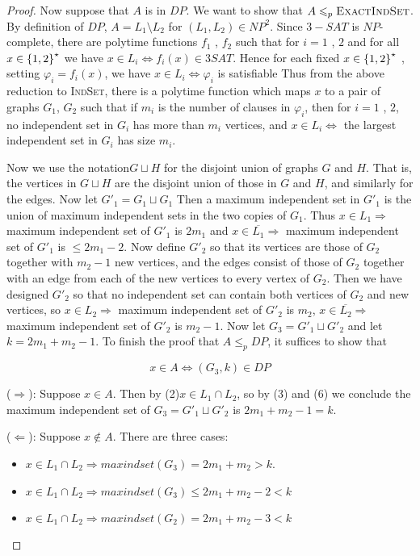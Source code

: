 \begin{proof}
    Now suppose that $A$ is in $DP$. We want to show that $A \leqslant_p \textsc{ExactIndSet}$. By definition of $DP$, $A = L_1 \setminus L_2$ for $(L_1,L_2) \in NP^2$. Since $3-SAT$ is $NP$-complete, there are polytime functions $f_1$ , $f_2$ such that for $i = 1$ , $2$ and for all  $x \in \left\{  1 , 2  \right\}^\star$ we have $x \in L_i \Leftrightarrow f_i ( x ) \in 3 SAT$. Hence for each fixed $x \in \left\{  1 , 2  \right\}^\star$ , setting $\varphi_i = f_i(x)$, we have  $x \in L_i \Leftrightarrow \varphi_i$ is satisfiable Thus from the above reduction to \textsc{IndSet}, there is a polytime function which maps $x$ to a pair of graphs $G_1$, $G_2$ such that if $m_i$ is the number of clauses in $\varphi_i$, then for $i = 1$ , $2$, no independent set in $G_i$ has more than $m_i$ vertices, and $x \in  L_i \Leftrightarrow$ the largest independent set in $G_i$ has size $m_i$.
    
    Now we use the notation$ G\sqcup H$ for the disjoint union of graphs $G$ and $H$. That is, the vertices in $G\sqcup H$ are the disjoint union of those in $G$ and $H$, and similarly for the edges. Now let $G'_1=G_1\sqcup G_1$ Then a maximum independent set in $G'_1$ is the union of maximum independent sets in the two copies of $G_1$. Thus $x\in L_1\Rightarrow$ maximum independent set of $G'_1$ is $2m_1$ and $x\in \overline{L_1} \Rightarrow$ maximum independent set of $G'_1$ is $\leqslant 2m_1-2$. Now define $G'_2$ so that its vertices are those of $G_2$ together with $m_2-1$ new vertices, and the edges consist of those of $G_2$ together with an edge from each of the new vertices to every vertex of $G_2$. Then we have designed $G'_2$ so that no independent set can contain both vertices of $G_2$ and new vertices, so $x\in L_2 \Rightarrow$ maximum independent set of $G'_2$ is $m_2$, $x\in \overline{L_2} \Rightarrow$ maximum independent set of $G'_2$ is $m_2-1$. Now let $G_3=G'_1\sqcup G'_2$ and let $k= 2m_1+m_2-1$. To finish the proof that $A\leqslant_p DP$, it suffices to show that 
    
    \begin{lemma}
        $$x\in A\Leftrightarrow(G_3, k)\in DP$$
    \end{lemma}
    
    ($\Rightarrow$): Suppose $x\in A$. Then by (2)$x\in L_1 \cap L_2$, so by (3) and (6) we conclude the maximum independent set of $G_3=G'_1\sqcup  G'_2$ is $2m_1+m_2-1 =k$.
    
    ($\Leftarrow$): Suppose $x \not\in A$. There are three cases:
    \begin{itemize}
        \item $x\in L_1 \cap L_2\Rightarrow maxindset(G_3) = 2m_1+m_2> k$.
        \item $x\in L_1 \cap L_2\Rightarrow maxindset(G_3)\leqslant 2m_1+m_2-2< k$
        \item $x\in L_1 \cap L_2\Rightarrow maxindset(G_2) = 2m_1+m_2-3< k$
    \end{itemize}
\end{proof}

